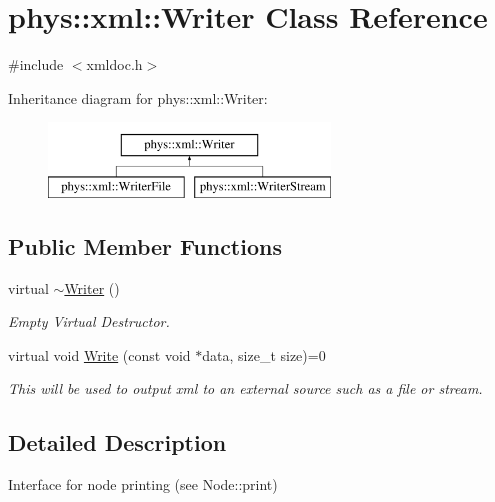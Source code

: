 \hypertarget{classphys_1_1xml_1_1Writer}{
\section{phys::xml::Writer Class Reference}
\label{d2/d28/classphys_1_1xml_1_1Writer}
}


{\ttfamily \#include $<$xmldoc.h$>$}

Inheritance diagram for phys::xml::Writer:\begin{figure}[H]
\begin{center}
\leavevmode
\includegraphics[height=2.000000cm]{d2/d28/classphys_1_1xml_1_1Writer}
\end{center}
\end{figure}
\subsection*{Public Member Functions}
\begin{DoxyCompactItemize}
\item 
\hypertarget{classphys_1_1xml_1_1Writer_a527c2e01738b1e570d08674eada21800}{
virtual \hyperlink{classphys_1_1xml_1_1Writer_a527c2e01738b1e570d08674eada21800}{$\sim$Writer} ()}
\label{d2/d28/classphys_1_1xml_1_1Writer_a527c2e01738b1e570d08674eada21800}

\begin{DoxyCompactList}\small\item\em Empty Virtual Destructor. \item\end{DoxyCompactList}\item 
virtual void \hyperlink{classphys_1_1xml_1_1Writer_ab6d4758ab53743f236eb64d5b2dd7e9e}{Write} (const void $\ast$data, size\_\-t size)=0
\begin{DoxyCompactList}\small\item\em This will be used to output xml to an external source such as a file or stream. \item\end{DoxyCompactList}\end{DoxyCompactItemize}


\subsection{Detailed Description}
Interface for node printing (see Node::print) 

